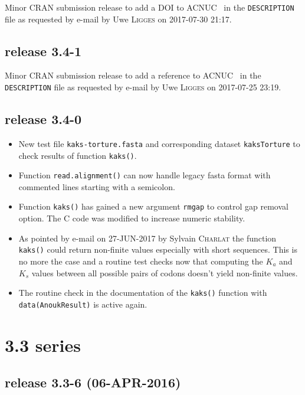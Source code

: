 \documentclass{article}
\begin{document}
Minor CRAN submission release to add a DOI to ACNUC~\cite{acnuc1984} in the \texttt{DESCRIPTION} file as requested by e-mail by Uwe \textsc{Ligges} on 2017-07-30 21:17.

\subsection*{release 3.4-1}

Minor CRAN submission release to add a reference to ACNUC~\cite{acnuc1984} in the \texttt{DESCRIPTION} file as requested by e-mail by Uwe \textsc{Ligges} on 2017-07-25 23:19.

\subsection*{release 3.4-0}

\begin{itemize}

\item New test file \texttt{kaks-torture.fasta} and corresponding dataset \texttt{kaksTorture} to check results of function \texttt{kaks()}.

\item Function \texttt{read.alignment()} can now handle legacy fasta format with commented lines starting with a semicolon.

\item Function \texttt{kaks()} has gained a new argument \texttt{rmgap} to control gap removal option. The C code was modified to increase numeric stability.

\item As pointed by e-mail on 27-JUN-2017 by Sylvain \textsc{Charlat} the function \texttt{kaks()} could return non-finite values especially with short sequences. This is no more the case and a routine test checks now that computing the $K_a$ and $K_s$ values between all possible pairs of codons doesn't yield non-finite values.

\item The routine check in the documentation of the \texttt{kaks()} function with \texttt{data(AnoukResult)} is active again.

\end{itemize}

\section*{3.3 series}

\subsection*{release 3.3-6 (06-APR-2016)}
\end{document}
